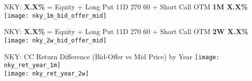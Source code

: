 \documentclass{beamer}
\begin{document}
\begin{frame}{\small NKY: {\bf X.X\%} = Equity + Long Put 11D 270 60 + Short Call OTM {\bf 1M X.X\%}}
\texttt{[image: nky\_1m\_bid\_offer\_mid]}
\end{frame}
\begin{frame}{\small NKY: {\bf X.X\%} = Equity + Long Put 11D 270 60 + Short Call OTM {\bf 2W X.X\%}}
\texttt{[image: nky\_2w\_bid\_offer\_mid]}
\end{frame}

\begin{frame}{\normalsize NKY: CC Return Difference (Bid-Offer vs Mid Price) by Year}
\texttt{[image: nky\_ret\_year\_1m]} \\
\texttt{[image: nky\_ret\_year\_2w]}
\end{frame}
\end{document}
